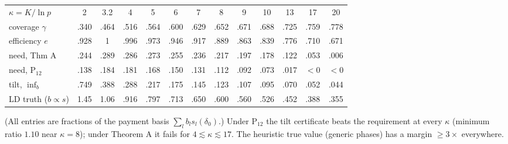 \begin{center}\small\begin{tabular}{lcccccccccccc}\toprule
$\kappa=K/\ln p$ & 2 & 3.2 & 4 & 5 & 6 & 7 & 8 & 9 & 10 & 13 & 17 & 20\\
coverage $\gamma$ & .340 & .464 & .516 & .564 & .600 & .629 & .652 & .671 & .688 & .725 & .759 & .778\\
efficiency $e$ & .928 & 1 & .996 & .973 & .946 & .917 & .889 & .863 & .839 & .776 & .710 & .671\\
need, Thm A & .244 & .289 & .286 & .273 & .255 & .236 & .217 & .197 & .178 & .122 & .053 & .006\\
need, P$_{12}$ & .138 & .184 & .181 & .168 & .150 & .131 & .112 & .092 & .073 & .017 & $<0$ & $<0$\\
tilt, $\inf_b$ & .749 & .388 & .288 & .217 & .175 & .145 & .123 & .107 & .095 & .070 & .052 & .044\\
LD truth ($b\propto s$) & 1.45 & 1.06 & .916 & .797 & .713 & .650 & .600 & .560 & .526 & .452 & .388 & .355\\\bottomrule
\end{tabular}\end{center}
(All entries are fractions of the payment basis $\sum_lb_ls_l(\delta_0)$.)  Under P$_{12}$ the tilt certificate beats the requirement at every $\kappa$
(minimum ratio $1.10$ near $\kappa=8$); under Theorem A it fails for $4\lesssim\kappa\lesssim17$.  The heuristic true value (generic phases) has a
margin $\ge3\times$ everywhere.
